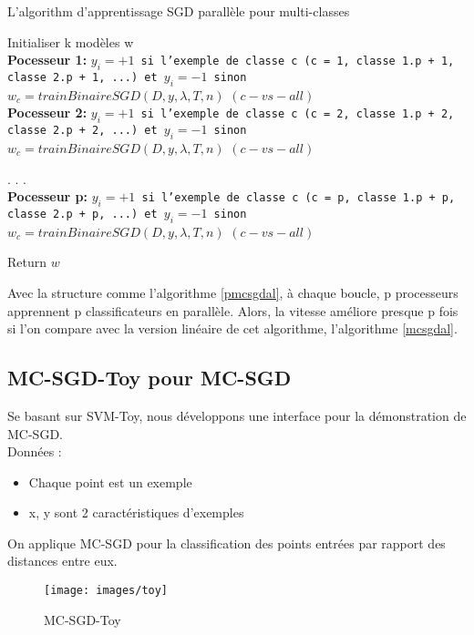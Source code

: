 \begin{algorithm}[H]
\caption{L'algorithm d'apprentissage SGD parallèle pour multi-classes}\label{pmcsgdal}
\begin{algorithmic}[1]

\State Initialiser k modèles w
\\
\BState \textbf{Pocesseur 1:}
\State \texttt{$y_i = +1$ si l'exemple de classe c (c = 1, classe 1.p + 1, classe 2.p + 1, ...) et $y_i = -1$ sinon}
\State \texttt{$w_c = trainBinaireSGD(D, y, \lambda, T, n)$} $(c-vs-all)$
\\
\BState \textbf{Pocesseur 2:}
\State \texttt{$y_i = +1$ si l'exemple de classe c (c = 2, classe 1.p + 2, classe 2.p + 2, ...) et $y_i = -1$ sinon}
\State \texttt{$w_c = trainBinaireSGD(D, y, \lambda, T, n)$} $(c-vs-all)$

\State .
\State .
\State .
\\
\BState \textbf{Pocesseur p:}
\State \texttt{$y_i = +1$ si l'exemple de classe c (c = p, classe 1.p + p, classe 2.p + p, ...) et $y_i = -1$ sinon}
\State \texttt{$w_c = trainBinaireSGD(D, y, \lambda, T, n)$} $(c-vs-all)$

\BState Return $w$

\EndProcedure
\end{algorithmic}
\end{algorithm}

Avec la structure comme l'algorithme \ref{pmcsgdal}, à chaque boucle, p processeurs apprennent p classificateurs en parallèle. Alors, la vitesse améliore presque p fois si l'on compare avec la version linéaire de cet algorithme, l'algorithme \ref{mcsgdal}.

\subsection{MC-SGD-Toy pour MC-SGD}
Se basant sur SVM-Toy\cite{cl01}, nous développons une interface pour la démonstration de MC-SGD.\\
Données :
\begin{itemize}
\item Chaque point est un exemple
\item x, y sont 2 caractéristiques d'exemples
\end{itemize}
On applique MC-SGD pour la classification des points entrées par rapport des distances entre eux.\\
\begin{figure}[ht!]
\centering
\texttt{[image: images/toy]}
\caption{MC-SGD-Toy}
\label{fig:toy}
\end{figure}

